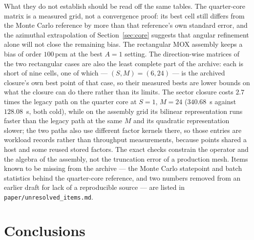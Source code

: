 \documentclass[11pt,a4paper]{article}
\newcommand{\pcm}{\,\mathrm{pcm}}
\begin{document}
What they do not establish should be read off the same tables. The quarter-core matrix
is a measured grid, not a convergence proof: its best cell still differs from the
Monte Carlo reference by more than that reference's own standard error, and the
azimuthal extrapolation of Section~\ref{sec:core} suggests that angular refinement
alone will not close the remaining bias. The rectangular MOX assembly keeps a bias of
order $100\pcm$ at the best $A{=}1$ setting. The direction-wise
matrices of the two rectangular cases are also the least complete part of the archive:
each is short of nine cells, one of which --- $(S,M){=}(6,24)$ --- is the archived
closure's own best point of that case, so their measured bests are lower bounds on what
the closure can do there rather than its limits. The sector closure costs $2.7$ times the
legacy path on the quarter core at $S{=}1$, $M{=}24$ ($340.68$~s against $128.08$~s,
both cold), while on the assembly grid its bilinear representation runs faster than
the legacy path at the same $M$ and its quadratic representation slower; the two paths
also use different factor kernels there, so those entries are workload records rather
than throughput measurements, because points shared a host and some reused stored
factors.
The exact checks constrain the operator and the algebra of the assembly, not the
truncation error of a production mesh. Items known to be missing from the archive ---
the Monte Carlo statepoint and batch statistics behind the quarter-core reference, and
two numbers removed from an earlier draft for lack of a reproducible source --- are
listed in \texttt{paper/unresolved\_items.md}.

\section{Conclusions}
\end{document}
